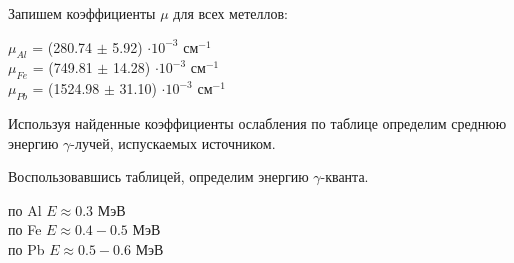     Запишем коэффициенты $\mu$ для всех метеллов:

    \begin{center}
        $\mu_{Al}$ = (280.74 $\pm$ 5.92) $\cdot 10^{-3}$ см$^{-1}$ \\
        $\mu_{Fe}$ = (749.81 $\pm$ 14.28) $\cdot 10^{-3}$ см$^{-1}$ \\
        $\mu_{Pb}$ = (1524.98 $\pm$ 31.10) $\cdot 10^{-3}$ см$^{-1}$ \\
    \end{center}

    Используя найденные коэффициенты ослабления по таблице определим среднюю энергию
    $\gamma$-лучей, испускаемых источником.

    Воспользовавшись таблицей, определим энергию $\gamma$-кванта.

    \begin{center}
        по Al $E \approx 0.3$ МэВ \\
        по Fe $E \approx 0.4 - 0.5$ МэВ \\
        по Pb $E \approx 0.5 - 0.6$ МэВ \\
    \end{center}

